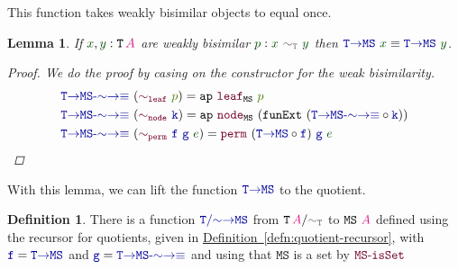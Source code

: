\documentclass[twoside,11pt,openright]{report}
\theoremstyle{plain} %
\newtheorem{lem}[thm]{Lemma}
\theoremstyle{definition}
\newtheorem{defn}[thm]{Definition}%
\theoremstyle{remark}
\newcommand*{\defref}[1]{\hyperref[defn:#1]{Definition~\ref*{defn:#1}}}
\newcommand*{\term}[1]{\textcolor{green!30!black}{#1}} %
\newcommand*{\pathterm}[1]{\textcolor{green!65!red!75!black}{#1}}
\newcommand*{\type}[1]{\textcolor{magenta!90!black}{#1}}
\newcommand*{\relation}[1]{\textcolor{gray!75!black}{\ensuremath{\mathtt{#1}}}}
\newcommand*{\function}[1]{\textcolor{blue!60!black}{\ensuremath{\mathtt{#1}}}}
\newcommand*{\constructor}[1]{\textcolor{purple!60!black}{\ensuremath{\mathtt{#1}}}}
\newcommand*{\typeformer}[1]{\ensuremath{\mathtt{#1}}}
\begin{document}
This function takes weakly bisimilar objects to equal once.
\begin{lem}
  If \(\term{x}, \term{y} : \typeformer{T}\,\type{A}\) are weakly bisimilar \(\term{p} : \term{x}~\relation{\sim_{T}}~\term{y}\) then \(\function{T{\rightarrow}MS}~\term{x} \equiv \function{T{\rightarrow}MS}~\term{y}\).
  \begin{proof}
    We do the proof by casing on the constructor for the weak bisimilarity.
    \begin{equation}
      \begin{aligned}
        &\function{T{\rightarrow}MS\text{-}{\sim}{\rightarrow}{\equiv}}~(\constructor{\sim_{leaf}}~\pathterm{p}) = \mathtt{ap}~\constructor{leaf}_{\typeformer{MS}}~\pathterm{p} \\
        &\function{T{\rightarrow}MS\text{-}{\sim}{\rightarrow}{\equiv}}~(\constructor{\sim_{node}}~\function{k}) = \mathtt{ap}~\constructor{node}_{\typeformer{MS}}~(\mathtt{funExt}~(\function{T{\rightarrow}MS\text{-}{\sim}{\rightarrow}{\equiv}} \circ \function{k})) \\
        &\function{T{\rightarrow}MS\text{-}{\sim}{\rightarrow}{\equiv}}~(\constructor{\sim_{perm}}~\function{f}~\function{g}~\term{e}) = \constructor{perm}~(\function{T{\rightarrow}MS} \circ \function{f})~\function{g}~\term{e}
      \end{aligned}
    \end{equation}
  \end{proof}
\end{lem}
\noindent With this lemma, we can lift the function \(\function{T{\rightarrow}MS}\) to the quotient.
\begin{defn}
  There is a function \(\function{T/{\sim}{\rightarrow}MS}\) from \(\typeformer{T}\,\type{A}/\relation{\sim_{T}}\) to \(\typeformer{MS}~\type{A}\) defined using the recursor for quotients, given in \defref{quotient-recursor}, with \(\function{f} = \function{T{\rightarrow}MS}\) and \(\function{g} = \function{T{\rightarrow}MS\text{-}{\sim}{\rightarrow}{\equiv}}\) and using that \(\typeformer{MS}\) is a set by \(\constructor{MS\text{-}isSet}\)
\end{defn}
\end{document}
